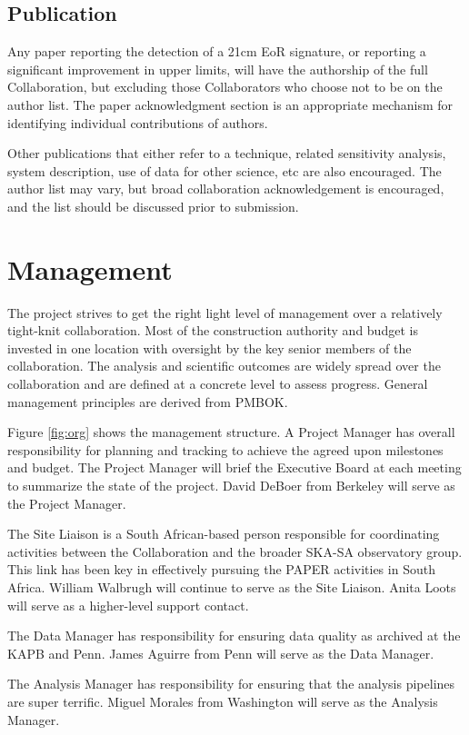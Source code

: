 \documentclass[preprint]{aastex}
\begin{document}
\subsection{Publication}
\label{sec:publication}
Any paper reporting the detection of a 21cm EoR signature, or reporting a significant
improvement in upper limits, will have the authorship of the full Collaboration, but
excluding those Collaborators who choose not to be on the author list. The paper
acknowledgment section is an appropriate mechanism for identifying individual
contributions of authors.

Other publications that either refer to a technique, related sensitivity analysis, system
description, use of data for other science, etc are also encouraged.  The author list
may vary, but broad collaboration acknowledgement is encouraged, and the list should
be discussed prior to submission.

\section{Management}
The project strives to get the right light level of management over a relatively tight-knit
collaboration.  Most of the construction authority and budget is invested in one location
with oversight by the key senior members of the collaboration.  The analysis and 
scientific outcomes are widely spread over the collaboration and are defined at a 
concrete level to assess progress.  General management principles are derived from
PMBOK.

Figure \ref{fig:org} shows the management structure.   A Project Manager has
overall responsibility for planning and tracking to achieve the agreed upon
milestones and budget. The Project Manager will brief the Executive Board at each
meeting to summarize the state of the project.  David DeBoer from Berkeley will serve
as the Project Manager.

The Site Liaison is a South African-based person responsible for coordinating activities
between the Collaboration and the broader SKA-SA observatory group.  This link has 
been key in effectively pursuing the PAPER activities in South Africa.  William Walbrugh
will continue to serve as the Site Liaison.  Anita Loots will serve as a higher-level
support contact.

The Data Manager has responsibility for ensuring data quality as archived at the KAPB and 
Penn.  James Aguirre from Penn will serve as the Data Manager.

The Analysis Manager has responsibility for ensuring that the analysis pipelines are super terrific.
Miguel Morales from Washington will serve as the Analysis Manager.
\end{document}
